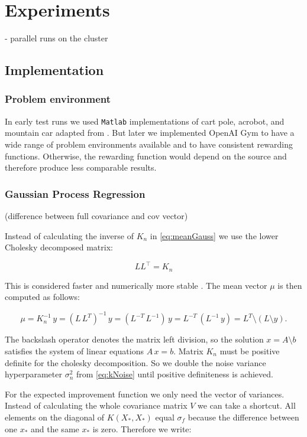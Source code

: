 \chapter{Experiments}
\label{chap:4}
%

- parallel runs on the cluster

\section{Implementation}

\subsection{Problem environment}
In early test runs we used \texttt{Matlab} implementations of cart pole, acrobot, and mountain car adapted from \cite{joseCode}. But later we implemented OpenAI Gym to have a wide range of problem environments available and to have consistent rewarding functions. Otherwise, the rewarding function would depend on the source and therefore produce less comparable results.



\subsection{Gaussian Process Regression}

(difference between full covariance and cov vector)

Instead of calculating the inverse of $K_n$ in \eqref{eq:meanGauss} we use the lower Cholesky decomposed matrix:

$$LL^\top=K_n$$

This is considered faster and numerically more stable \cite{rasmussen2006gaussian}. The mean vector $\mu$ is then computed as follows:

\begin{equation} \label{eq:regression}
    \mu = K_n^{-1}\,y = (L\,L^{T})^{-1}\,y = (L^{-T}\,L^{-1})\,y = L^{-T}\,(L^{-1}\,y) = L^{T}\setminus(L \setminus y).
\end{equation}

The backslash operator denotes the matrix left division, so the solution $x=A\setminus b$ satisfies the system of linear equations $A\,x=b$.
Matrix $K_n$ must be positive definite for the cholesky decomposition. So we double the noise variance hyperparameter $\sigma_n^2$ from \eqref{eq:kNoise} until positive definiteness is achieved.

For the expected improvement function we only need the vector of variances. Instead of calculating the whole covariance matrix $V$ we can take a shortcut. All elements on the diagonal of $K(X_*,X_*)$ equal $\sigma_f$ because the difference between one $x_*$ and the same $x_*$ is zero. Therefore we write:

